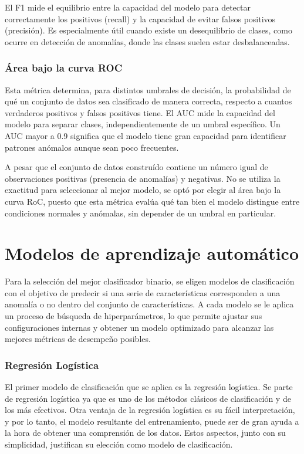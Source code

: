 \documentclass[11pt,a4paper,spanish]{book}
\numberwithin{equation}{chapter}
\numberwithin{figure}{chapter}
\begin{document}
El F1 mide el equilibrio entre la capacidad del modelo para detectar correctamente los 
positivos (recall) y la capacidad de evitar falsos positivos (precisión). 
Es especialmente útil cuando existe un desequilibrio de clases, como ocurre en detección 
de anomalías, donde las clases suelen estar desbalanceadas. 


\subsubsection{Área bajo la curva ROC}

Esta métrica determina, para distintos umbrales de decisión, la probabilidad de qué un 
conjunto de datos sea clasificado de manera correcta, respecto a cuantos verdaderos 
positivos y falsos positivos tiene. El AUC mide la capacidad del modelo para separar 
clases, independientemente de un umbral específico. Un AUC mayor a 0.9 significa que el 
modelo tiene gran capacidad para identificar patrones anómalos aunque sean poco frecuentes.

A pesar que el conjunto de datos construído contiene un número igual de observaciones 
positivas (presencia de anomalías) y negativas. No se utiliza la exactitud para 
seleccionar al mejor modelo, se optó por elegir al área bajo la curva RoC, puesto que 
esta métrica evalúa qué tan bien el modelo distingue entre condiciones normales y 
anómalas, sin depender de un umbral en particular. 


\section{Modelos de aprendizaje automático}

Para la selección del mejor clasificador binario, se eligen modelos de clasificación 
con el objetivo de predecir si una serie de características corresponden a una anomalía 
o no dentro del conjunto de características. A cada modelo se le aplica un proceso de 
búsqueda de hiperparámetros, lo que permite ajustar sus configuraciones internas y 
obtener un modelo optimizado para alcanzar las mejores métricas de desempeño posibles. 


\subsubsection{Regresión Logística}

El primer modelo de clasificación que se aplica es la regresión logística. Se parte de  
regresión logística ya que es uno de los métodos clásicos de clasificación y de los  más 
efectivos. Otra ventaja de la regresión logística es su fácil interpretación, y por lo 
tanto, el modelo resultante del entrenamiento, puede ser de gran ayuda a la hora de 
obtener una comprensión de los datos. Estos aspectos, junto con su simplicidad, 
justifican su elección como modelo de clasificación.
\end{document}
